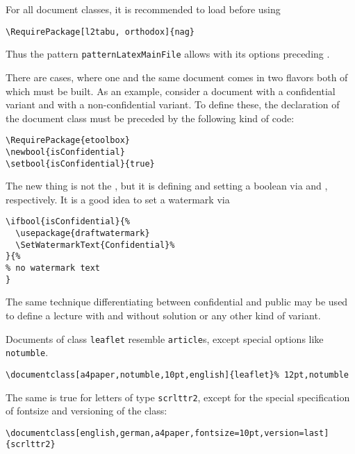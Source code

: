 For all document classes, it is recommended to load  
before  using 
%
\begin{Verbatim}[fontsize=\small]
  \RequirePackage[l2tabu, orthodox]{nag}
\end{Verbatim}
%
Thus the pattern \texttt{patternLatexMainFile} 
allows  with its options preceding . 

There are cases, where one and the same document 
comes in two flavors both of which must be built. 
As an example, consider a document with a confidential variant 
and with a non-confidential variant. 
To define these, the declaration of the document class 
must be preceded by the following kind of code: 
%
\begin{Verbatim}[fontsize=\small]
\RequirePackage{etoolbox}
\newbool{isConfidential}
\setbool{isConfidential}{true}
\end{Verbatim}

The new thing is not the , 
but it is defining and setting a boolean 
via  and , respectively. 
It is a good idea to set a watermark via 
%
\begin{Verbatim}[fontsize=\small]
\ifbool{isConfidential}{%
  \usepackage{draftwatermark}
  \SetWatermarkText{Confidential}%
}{%
% no watermark text
}
\end{Verbatim}

The same technique differentiating between confidential and public 
may be used to define a lecture with and without solution 
or any other kind of variant. 

Documents of class \texttt{leaflet} resemble \texttt{article}s, 
except special options like \texttt{notumble}. 

\begin{Verbatim}[fontsize=\footnotesize]
  \documentclass[a4paper,notumble,10pt,english]{leaflet}% 12pt,notumble
\end{Verbatim}

The same is true for letters of type \texttt{scrlttr2}, 
except for the special specification of fontsize and versioning of the class: 

\begin{Verbatim}[fontsize=\footnotesize]
\documentclass[english,german,a4paper,fontsize=10pt,version=last]{scrlttr2}
\end{Verbatim}


